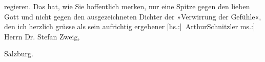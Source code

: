                regieren. \strikeout{(}Das hat, wie Sie hoffentlich merken, nur eine Spitze gegen den lieben Gott
               und nicht gegen den ausgezeichneten Dichter der »Verwirrung der Gefühle«, den ich herzlich grüsse als sein aufrichtig
               ergebener\pend
           \pstart \spacefill\mbox{{[}hs.:{]} ArthurSchnitzler}\pend{}
\pstart
           \noindent{}{[}ms.:{]} Herrn Dr. Stefan Zweig,\pend
           
\pstart
           Salzburg.\pend
           \endnumbering{}  \newcommand{\dateiname}{L03747}\newcommand{\titel}{Arthur Schnitzler an Stefan Zweig, 2. 10. 1926}\newcommand{\editorInnen}{Selma Jahnke und Martin Anton Müller}
